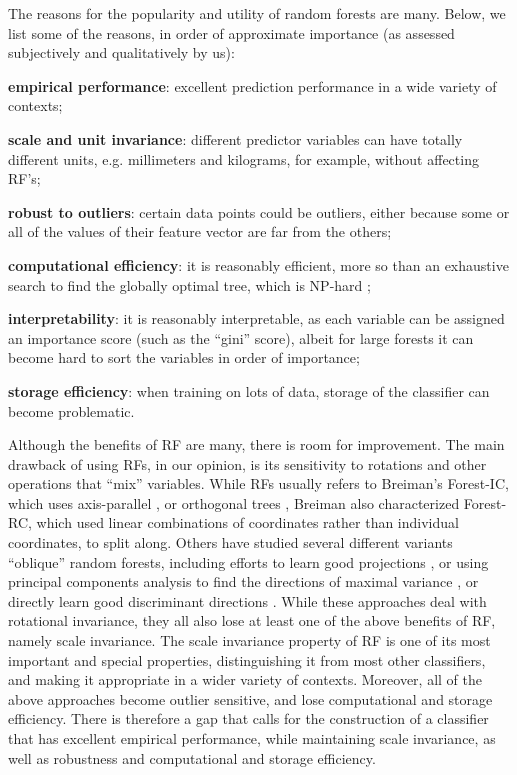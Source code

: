 \documentclass{article} %
\begin{document}
The reasons for the popularity and utility of random forests are many. Below, we list some of the reasons, in order of approximate importance (as assessed subjectively and qualitatively by us):
\begin{compactitem}
\item \textbf{empirical performance}: excellent prediction performance in a wide variety of contexts;
\item \textbf{scale and unit invariance}: different predictor variables can have totally different units, e.g. millimeters and kilograms, for example, without affecting RF's;
\item \textbf{robust to outliers}: certain data points could be outliers, either because some or all of the values of their feature vector are far from the others;
\item \textbf{computational efficiency}: it is reasonably efficient, more so than an exhaustive search to find the globally optimal tree, which is NP-hard \cite{Heath1993};
\item \textbf{interpretability}: it is reasonably interpretable, as each variable can be assigned an importance score (such as the ``gini'' score), albeit for large forests it can become hard to sort the variables in order of importance;
\item \textbf{storage efficiency}: when training on lots of data, storage of the classifier can become problematic.
\end{compactitem}


Although the benefits of RF are many, there is room for improvement. The main drawback of using RFs, in our opinion, is its sensitivity to rotations and other operations that ``mix'' variables.  While RFs usually refers to Breiman's Forest-IC, which uses axis-parallel \cite{Heath1993}, or orthogonal trees \cite{Menze2011}, Breiman also characterized Forest-RC, which used linear combinations of coordinates rather than individual coordinates, to split along.  Others have studied several different variants ``oblique'' random forests, including efforts to learn good projections \cite{Heath1993,Tan2004}, or using principal components analysis to find the directions of maximal variance \cite{Ho1998,Rodriguez2006}, or directly learn good discriminant directions \cite{Menze2011}.  While these approaches deal with rotational invariance, they all also lose at least one of the above benefits of RF, namely scale invariance.  The scale invariance property of RF is one of its most important and special properties, distinguishing it from most other classifiers, and making it appropriate in a wider variety of contexts.  
Moreover, all of the above approaches become outlier sensitive, and lose computational and storage efficiency.
There is therefore a gap that calls for the construction of a classifier that has excellent empirical performance, while maintaining scale invariance, as well as robustness and computational and storage efficiency.
\end{document}
